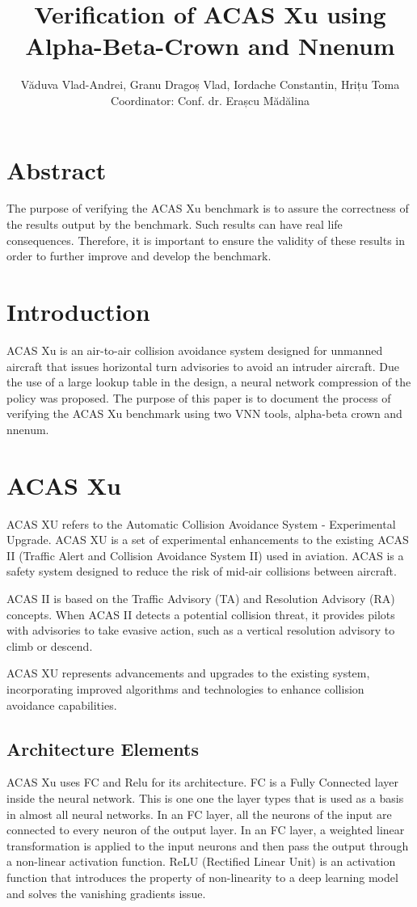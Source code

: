 \documentclass{article}
\title{Verification of ACAS Xu using Alpha-Beta-Crown and Nnenum }
\author{Văduva Vlad-Andrei, Granu Dragoș Vlad, Iordache Constantin, Hrițu Toma\\[1cm]{\small Coordinator: Conf. dr. Erașcu Mădălina}}
\begin{document}
\maketitle
\newpage
\tableofcontents
\clearpage
\section{Abstract}
The purpose of verifying the ACAS Xu benchmark is to assure the correctness of the results output by the benchmark. Such results can have real life consequences. Therefore, it is important to ensure the validity of these results in order to further improve and develop the benchmark.
\section{Introduction\cite{vnn}}
ACAS Xu is an air-to-air collision avoidance system designed for unmanned aircraft that issues horizontal turn advisories to avoid an intruder aircraft. Due the use of a large lookup table in the design, a neural network compression of the policy was proposed. The purpose of this paper is to document the process of verifying the ACAS Xu benchmark using two VNN tools, alpha-beta crown and nnenum.
\section{ACAS Xu \cite{acasxu}}
ACAS XU refers to the Automatic Collision Avoidance System - Experimental Upgrade. ACAS XU is a set of experimental enhancements to the existing ACAS II (Traffic Alert and Collision Avoidance System II) used in aviation. ACAS is a safety system designed to reduce the risk of mid-air collisions between aircraft.

ACAS II is based on the Traffic Advisory (TA) and Resolution Advisory (RA) concepts. When ACAS II detects a potential collision threat, it provides pilots with advisories to take evasive action, such as a vertical resolution advisory to climb or descend.

ACAS XU represents advancements and upgrades to the existing system, incorporating improved algorithms and technologies to enhance collision avoidance capabilities. 

\subsection{Architecture Elements}
ACAS Xu uses FC and Relu for its architecture.\newline
FC is a Fully Connected layer inside the neural network. This is one one the layer types that is used as a basis in almost all neural networks. In an FC layer, all the neurons of the input are connected to every neuron of the output layer. In an FC layer, a weighted linear transformation is applied to the input neurons and then pass the output through a non-linear activation function.
\newline
ReLU\cite{relu} (Rectified Linear Unit) is an activation function that introduces the property of non-linearity to a deep learning model and solves the vanishing gradients issue.
\newpage
\end{document}
